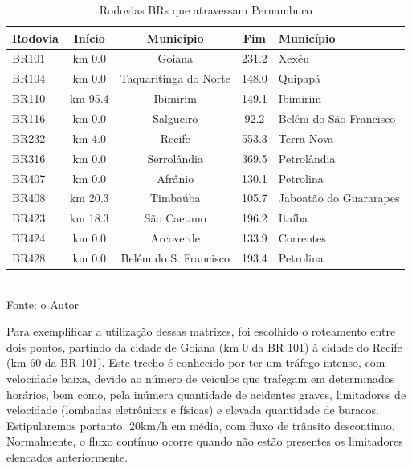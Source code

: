 \begin{table}[!ht]
	\centering
	\caption{Rodovias BRs que atravessam Pernambuco}
	\vspace{1mm}
	\begin{tabular}{l|c|c|c|l}
		\hline
		\textbf{Rodovia} & \textbf{Início} & \textbf{Município}  & \textbf{Fim} & \textbf{Município} \\
		\hline
		BR101 & km 0.0 & Goiana & 231.2 & Xexéu\\
		BR104 & km 0.0 & Taquaritinga do Norte & 148.0 & Quipapá\\
		BR110 & km 95.4 & Ibimirim & 149.1 & Ibimirim\\
		BR116 & km 0.0 & Salgueiro & 92.2 & Belém do São Francisco\\
		BR232 & km 4.0 & Recife & 553.3 & Terra Nova\\
		BR316 & km 0.0 & Serrolândia & 369.5 & Petrolândia\\
		BR407 & km 0.0 & Afrânio & 130.1 & Petrolina\\
		BR408 & km 20.3 & Timbaúba & 105.7 & Jaboatão do Guararapes\\
		BR423 & km 18.3 & São Caetano & 196.2 & Itaíba\\
		BR424 & km 0.0 & Arcoverde & 133.9 & Correntes\\
		BR428 & km 0.0 & Belém do S. Francisco & 193.4 & Petrolina\\
	\end{tabular}
	\\
	\tiny Fonte: o Autor
\end{table}

\vspace{7mm}

Para exemplificar a utilização dessas matrizes, foi escolhido o roteamento entre dois pontos, partindo da cidade de Goiana (km 0 da BR 101) à cidade do Recife (km 60 da BR 101). Este trecho é conhecido por ter um tráfego intenso, com velocidade  baixa, devido ao número de veículos que trafegam em determinados horários, bem como, pela inúmera quantidade de acidentes graves, limitadores de velocidade (lombadas eletrônicas e físicas) e elevada quantidade de buracos. Estipularemos portanto, 20km/h em média, com fluxo de trânsito descontinuo. Normalmente, o fluxo contínuo ocorre quando não estão presentes os limitadores elencados anteriormente.

